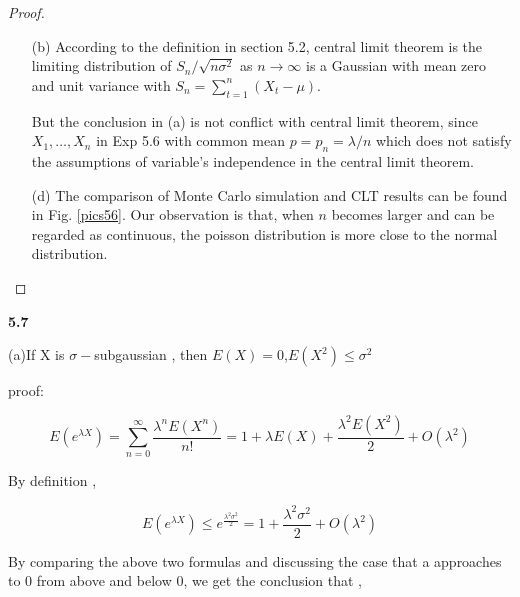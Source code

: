 \begin{proof}
\begin{enumerate}
		Then, we just need to proof the coefficient of possion is 1.
		\begin{equation}
		\begin{aligned}
		\notag
		&\ell_{h=\infty} \underbrace{\frac{n !}{(n-x) !} \frac{1}{n^{x}}}_{h \rightarrow \infty}=1 . \\
		&\frac{n(n-1)(n-2) \cdots(n-x+1)}{n}=1 .
		\end{aligned}
		\end{equation}
		Thus, 
		\begin{equation} 
		\notag
		\lim _{n \rightarrow \infty} P_{n}(x)=e^{-\lambda} \lambda^{x} /(x !)
		\end{equation}
	\item [(b)]
		According to the definition in section 5.2, central limit theorem is the limiting distribution of $S_{n} / \sqrt{n \sigma^{2}}$ as $n \rightarrow \infty$ is a Gaussian with mean zero and unit variance with $S_{n}=\sum_{t=1}^{n}\left(X_{t}-\mu \right)$. 
		
		But  the conclusion in (a) is not conflict with central limit theorem, since $X_1, \ldots, X_n$ in Exp 5.6 with common mean $p=p_{n}=\lambda / n$ which does not satisfy the assumptions of variable's independence in the central limit theorem.
	\item [(d)] The comparison of Monte Carlo simulation and CLT results can be found in Fig. \ref{pics56}.
		Our observation is that, when $n$ becomes larger and can be regarded as continuous, the poisson distribution is more close to the normal distribution.
\end {enumerate}
\end{proof}




\noindent\textbf{5.7}


(a)If X is $\sigma-$subgaussian , then $E(X)=0$,$E(X^2)\leq\sigma^2$

proof:

\begin{equation}
E(e^{\lambda X}) = \sum_{n=0}^{\infty}\frac{\lambda^n E(X^n)}{n!}=1+\lambda E(X)+\frac{\lambda^2 E(X^2)}{2}+O(\lambda^2)
\end{equation}

By definition ,

\begin{equation}
E(e^{\lambda X})\leq e^{\frac{\lambda^2 \sigma^2}{2}}=1+\frac{\lambda^2 \sigma^2}{2}+O(\lambda^2)
\end{equation}

By comparing the above two formulas and discussing the case that a approaches to 0 from above and below 0, we get the conclusion that ,

